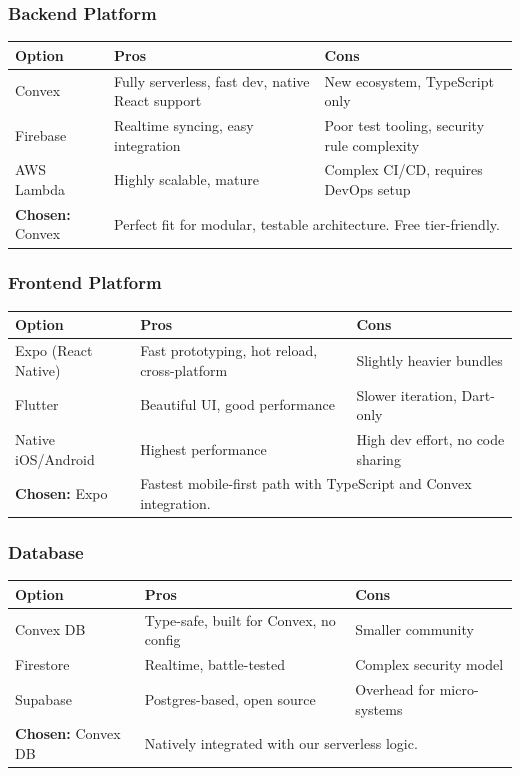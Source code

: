 \documentclass[12pt]{article}
\begin{document}
\subsubsection*{Backend Platform}
\begin{tabular}{|l|p{6cm}|p{6cm}|}
\hline
\textbf{Option} & \textbf{Pros} & \textbf{Cons} \\
\hline
Convex & Fully serverless, fast dev, native React support & New ecosystem, TypeScript only \\
\hline
Firebase & Realtime syncing, easy integration & Poor test tooling, security rule complexity \\
\hline
AWS Lambda & Highly scalable, mature & Complex CI/CD, requires DevOps setup \\
\hline
\textbf{Chosen:} Convex & \multicolumn{2}{l|}{Perfect fit for modular, testable architecture. Free tier-friendly.} \\
\hline
\end{tabular}

\vspace{1em}

\subsubsection*{Frontend Platform}
\begin{tabular}{|l|p{6cm}|p{6cm}|}
\hline
\textbf{Option} & \textbf{Pros} & \textbf{Cons} \\
\hline
Expo (React Native) & Fast prototyping, hot reload, cross-platform & Slightly heavier bundles \\
\hline
Flutter & Beautiful UI, good performance & Slower iteration, Dart-only \\
\hline
Native iOS/Android & Highest performance & High dev effort, no code sharing \\
\hline
\textbf{Chosen:} Expo & \multicolumn{2}{l|}{Fastest mobile-first path with TypeScript and Convex integration.} \\
\hline
\end{tabular}

\vspace{1em}

\subsubsection*{Database}
\begin{tabular}{|l|p{6cm}|p{6cm}|}
\hline
\textbf{Option} & \textbf{Pros} & \textbf{Cons} \\
\hline
Convex DB & Type-safe, built for Convex, no config & Smaller community \\
\hline
Firestore & Realtime, battle-tested & Complex security model \\
\hline
Supabase & Postgres-based, open source & Overhead for micro-systems \\
\hline
\textbf{Chosen:} Convex DB & \multicolumn{2}{l|}{Natively integrated with our serverless logic.} \\
\hline
\end{tabular}
\end{document}
